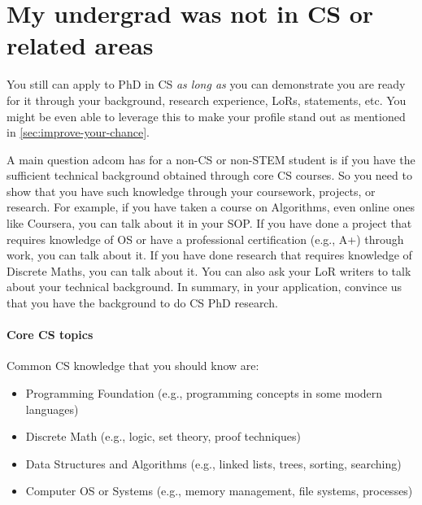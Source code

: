 \documentclass[oneside,11pt,dvipsnames]{book}
\begin{document}




\section{My undergrad was not in CS or related areas}\label{sec:non-stem}

You still can apply to PhD in CS \emph{as long as} you can demonstrate you are ready for it through your background, research experience, LoRs, statements, etc. You might be even able to leverage this to make your profile stand out as mentioned in \autoref{sec:improve-your-chance}.

A main question adcom has for a non-CS or non-STEM student is if you have the sufficient technical background obtained through core CS courses.  So you need to show that you have such knowledge through your coursework, projects, or research.
For example, if you have taken a course on Algorithms, even online ones like Coursera, you can talk about it in your SOP.  If you have done a project that requires knowledge of OS or have a professional certification (e.g., A+) through work, you can talk about it.  If you have done research that requires knowledge of Discrete Maths, you can talk about it.  You can also ask your LoR writers to talk about your technical background.
In summary, in your application, convince us that you have the background to do CS PhD research.


\paragraph{Core CS topics} Common CS knowledge that you should know are:
\begin{itemize}
  \item Programming Foundation (e.g., programming concepts in some modern languages)
  \item Discrete Math (e.g., logic, set theory, proof techniques)
  \item Data Structures and Algorithms (e.g., linked lists, trees, sorting, searching)
  \item Computer OS or Systems (e.g., memory management, file systems, processes)
\end{itemize}
\end{document}
